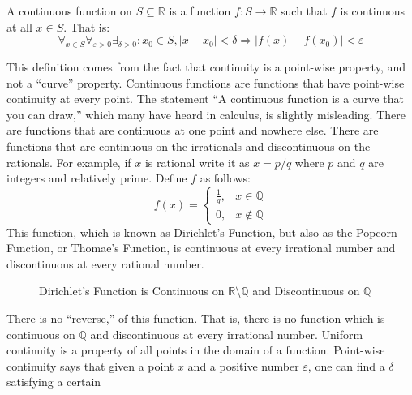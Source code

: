     \begin{definition}
        A continuous function on $S\subseteq\mathbb{R}$ is a function
        $f:S\rightarrow\mathbb{R}$ such that $f$ is continuous at all
        $x\in{S}$. That is:
        \begin{equation}
            \forall_{x\in{S}}\forall_{\varepsilon>0}
            \exists_{\delta>0}:x_{0}\in{S},|x-x_{0}|<\delta
            \Rightarrow|f(x)-f(x_{0})|<\varepsilon
        \end{equation}
    \end{definition}
    This definition comes from the fact that continuity is a point-wise
    property, and not a ``curve'' property. Continuous functions are
    functions that have point-wise continuity at every point. The statement
    ``A continuous function is a curve that you can draw,'' which many have
    heard in calculus, is slightly misleading. There are functions that are
    continuous at one point and nowhere else. There are functions that are
    continuous on the irrationals and discontinuous on the rationals. For
    example, if $x$ is rational write it as $x=p/q$ where $p$ and $q$ are
    integers and relatively prime. Define $f$ as follows:
    \begin{equation}
        f(x)=
        \begin{cases}
            \frac{1}{q},&x\in\mathbb{Q}\\
            0,&x\notin\mathbb{Q}
        \end{cases}
    \end{equation}
    This function, which is known as Dirichlet's Function, but also as the
    Popcorn Function, or Thomae's Function, is continuous at every irrational
    number and discontinuous at every rational number.
    \begin{figure}[H]
        \captionsetup{type=figure}
        \centering
        
        \caption[Dirichlet's Function]
            {Dirichlet's Function is Continuous on
             $\mathbb{R}\setminus\mathbb{Q}$ and
             Discontinuous on $\mathbb{Q}$}
        \label{fig:Funct:Dirichlet_Thomae_Function}
    \end{figure}
    There is no ``reverse,'' of this function. That is, there is no function
    which is continuous on $\mathbb{Q}$ and discontinuous at every irrational
    number. Uniform continuity is a property of all points in the domain of a
    function. Point-wise continuity says that given a point $x$ and a positive
    number $\varepsilon$, one can find a $\delta$ satisfying a certain

